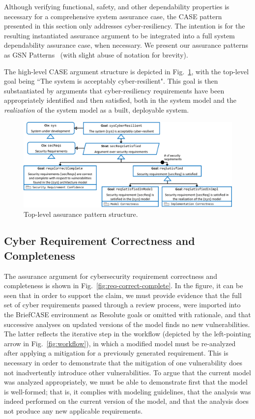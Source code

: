 Although verifying functional, safety, and other dependability properties is necessary for a comprehensive system assurance case, the CASE pattern presented in this section only addresses cyber-resiliency.  The intention is for the resulting instantiated assurance argument to be integrated into a full system dependability assurance case, when necessary.  We present our assurance patterns as GSN Patterns~\cite{Kelly97:patterns} (with slight abuse of notation for brevity).

The high-level CASE argument structure is depicted in Fig.~\ref{fig:top-level},
with the top-level goal being ``The system is acceptably cyber-resilient".  
This goal is then substantiated by arguments that cyber-resiliency requirements have been appropriately identified and then satisfied, both in the system model and the \textit{realization} of the system model as a built, deployable system.

\begin{figure}[h] 
	\centering 
	\includegraphics[width=\textwidth]{figs/top-level.png}
	\caption{Top-level assurance pattern structure.}
	\label{fig:top-level} 
\end{figure}

\subsection{Cyber Requirement Correctness and Completeness}

The assurance argument for cybersecurity requirement correctness and completeness is shown in Fig.~\ref{fig:req-correct-complete}.  
In the figure, it can be seen that in order to support the claim, we must provide evidence that the full set of cyber requirements passed through a review process, were imported into the BriefCASE environment as Resolute goals or omitted with rationale, and that successive analyses on updated versions of the model finds no new vulnerabilities.  The latter reflects the iterative step in the workflow (depicted by the left-pointing arrow in Fig.~\ref{fig:workflow}), in which a modified model must be re-analyzed after applying a mitigation for a previously generated requirement.  This is necessary in order to demonstrate that the mitigation of one vulnerability does not inadvertently introduce other vulnerabilities.  To argue that the current model was analyzed appropriately, we must be able to demonstrate first that the model is well-formed; that is, it complies with modeling guidelines, that the analysis was indeed performed on the current version of the model, and that the analysis does not produce any new applicable requirements.

